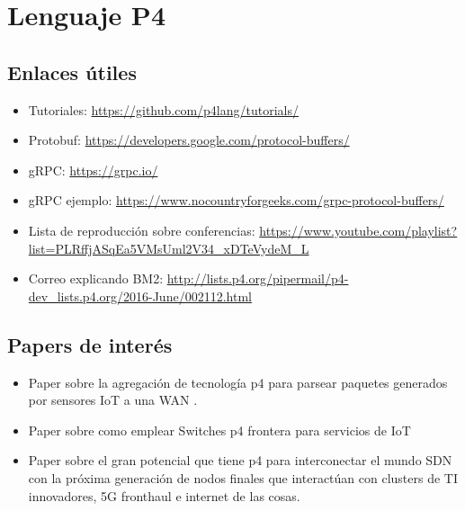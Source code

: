 \chapter{Lenguaje P4}
\section{Enlaces útiles}
\begin{itemize}
    \item Tutoriales: \url{https://github.com/p4lang/tutorials/}
    \item Protobuf: \url{https://developers.google.com/protocol-buffers/}
    \item gRPC: \url{https://grpc.io/}
    \item gRPC ejemplo: \url{https://www.nocountryforgeeks.com/grpc-protocol-buffers/}
    \item Lista de reproducción sobre conferencias: \newline 
    \url{https://www.youtube.com/playlist?list=PLRffjASqEa5VMsUml2V34_xDTeVydeM_L}
    \item Correo explicando BM2: \url{http://lists.p4.org/pipermail/p4-dev_lists.p4.org/2016-June/002112.html}
    
\end{itemize}
\section{Papers de interés}
\begin{itemize}
    \item Paper sobre la agregación de tecnología p4 para parsear paquetes generados por sensores IoT a una WAN \cite{p4_iot-paper}.
    \item Paper sobre como emplear Switches p4 frontera para servicios de IoT \cite{8470257}
    \item Paper sobre el gran potencial que tiene p4 para interconectar el mundo SDN con la próxima generación de nodos finales que interactúan con clusters de TI innovadores, 5G fronthaul e internet de las cosas. \cite{8651200}
    
\end{itemize}

{}

\newpage
